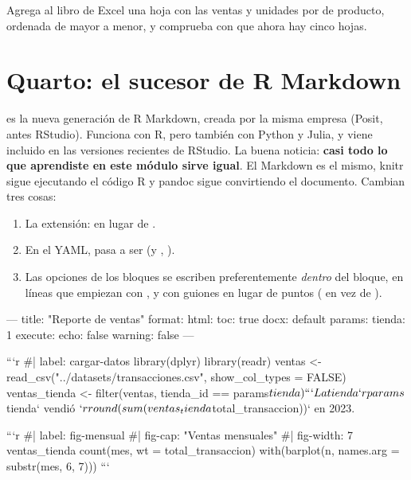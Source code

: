 \begin{hazlotu}
Agrega al libro de Excel una hoja  con las ventas y
unidades por  de producto, ordenada de mayor a menor, y
comprueba con  que ahora hay cinco hojas.
\end{hazlotu}

\section{Quarto: el sucesor de R Markdown}
\label{sec:m8-quarto}

 es la nueva generación de R Markdown, creada por la misma
empresa (Posit, antes RStudio). Funciona con R, pero también con Python y
Julia, y viene incluido en las versiones recientes de RStudio. La buena
noticia: \textbf{casi todo lo que aprendiste en este módulo sirve igual}. El
Markdown es el mismo, knitr sigue ejecutando el código R y pandoc sigue
convirtiendo el documento. Cambian tres cosas:

\begin{enumerate}
  \item La extensión:  en lugar de .
  \item En el YAML,  pasa a ser
         (y , ).
  \item Las opciones de los bloques se escriben preferentemente
        \emph{dentro} del bloque, en líneas que empiezan con \codigo{\#|}, y
        con guiones en lugar de puntos ( en vez de
        ).
\end{enumerate}

\begin{textocodigo}[title=reportes/reporte-quarto.qmd]
---
title: "Reporte de ventas"
format:
  html:
    toc: true
  docx: default
params:
  tienda: 1
execute:
  echo: false
  warning: false
---

```{r}
#| label: cargar-datos
library(dplyr)
library(readr)
ventas <- read_csv("../datasets/transacciones.csv",
                   show_col_types = FALSE)
ventas_tienda <- filter(ventas, tienda_id == params$tienda)
```

La tienda `r params$tienda` vendió
$`r round(sum(ventas_tienda$total_transaccion))` en 2023.

```{r}
#| label: fig-mensual
#| fig-cap: "Ventas mensuales"
#| fig-width: 7
ventas_tienda %
  count(mes, wt = total_transaccion) %
  with(barplot(n, names.arg = substr(mes, 6, 7)))
```
\end{textocodigo}

